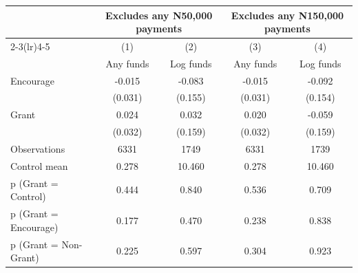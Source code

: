 \begin{tabular*}{\hsize}{@{\hskip\tabcolsep\extracolsep\fill}l*{4}{c}}
\toprule
                    &\multicolumn{2}{c}{Excludes any N50,000 payments}&\multicolumn{2}{c}{Excludes any N150,000 payments}\\\cmidrule(lr){2-3}\cmidrule(lr){4-5}
                    &\multicolumn{1}{c}{(1)}&\multicolumn{1}{c}{(2)}&\multicolumn{1}{c}{(3)}&\multicolumn{1}{c}{(4)}\\
                    &\multicolumn{1}{c}{Any funds}&\multicolumn{1}{c}{Log funds}&\multicolumn{1}{c}{Any funds}&\multicolumn{1}{c}{Log funds}\\
\midrule
Encourage           &      -0.015&      -0.083&      -0.015&      -0.092\\
                    &     (0.031)&     (0.155)&     (0.031)&     (0.154)\\
\addlinespace
Grant               &       0.024&       0.032&       0.020&      -0.059\\
                    &     (0.032)&     (0.159)&     (0.032)&     (0.159)\\
\midrule
Observations        &        6331&        1749&        6331&        1739\\
Control mean        &       0.278&      10.460&       0.278&      10.460\\
p (Grant = Control) &       0.444&       0.840&       0.536&       0.709\\
p (Grant = Encourage)&       0.177&       0.470&       0.238&       0.838\\
p (Grant = Non-Grant)&       0.225&       0.597&       0.304&       0.923\\
\bottomrule
\end{tabular*}

